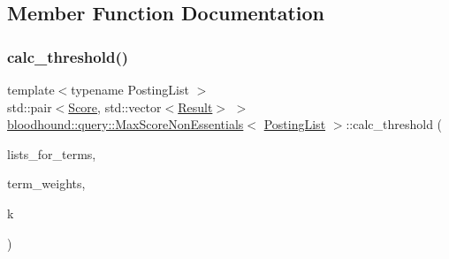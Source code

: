 \subsection{Member Function Documentation}
\mbox{\label{classbloodhound_1_1query_1_1MaxScoreNonEssentials_a99253d51fb9d66cb6c4fd97e499ab1b0}} 
\subsubsection{\texorpdfstring{calc\+\_\+threshold()}{calc\_threshold()}}
{\footnotesize\ttfamily template$<$typename Posting\+List $>$ \\
std\+::pair$<$\hyperlink{structbloodhound_1_1Score}{Score}, std\+::vector$<$\hyperlink{structbloodhound_1_1query_1_1Result}{Result}$>$ $>$ \hyperlink{classbloodhound_1_1query_1_1MaxScoreNonEssentials}{bloodhound\+::query\+::\+Max\+Score\+Non\+Essentials}$<$ \hyperlink{classbloodhound_1_1PostingList}{Posting\+List} $>$\+::calc\+\_\+threshold (\begin{DoxyParamCaption}\item[{const std\+::vector$<$ \hyperlink{classbloodhound_1_1PostingList}{Posting\+List} $>$ \&}]{lists\+\_\+for\+\_\+terms,  }\item[{const std\+::vector$<$ \hyperlink{structbloodhound_1_1Score}{Score} $>$ \&}]{term\+\_\+weights,  }\item[{std\+::size\+\_\+t}]{k }\end{DoxyParamCaption})\hspace{0.3cm}{\ttfamily [inline]}}

\mbox{\label{classbloodhound_1_1query_1_1MaxScoreNonEssentials_a2ea9f46aa9175fe20243e7cb2886f1f0}} 
